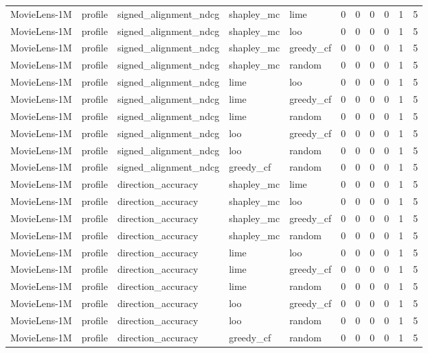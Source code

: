\begin{table}[t]
{\begin{tabular}{lllllrrrrrr}
MovieLens-1M & profile & signed\_alignment\_ndcg & shapley\_mc & lime & 0 & 0 & 0 & 0 & 1 & 5 \\
MovieLens-1M & profile & signed\_alignment\_ndcg & shapley\_mc & loo & 0 & 0 & 0 & 0 & 1 & 5 \\
MovieLens-1M & profile & signed\_alignment\_ndcg & shapley\_mc & greedy\_cf & 0 & 0 & 0 & 0 & 1 & 5 \\
MovieLens-1M & profile & signed\_alignment\_ndcg & shapley\_mc & random & 0 & 0 & 0 & 0 & 1 & 5 \\
MovieLens-1M & profile & signed\_alignment\_ndcg & lime & loo & 0 & 0 & 0 & 0 & 1 & 5 \\
MovieLens-1M & profile & signed\_alignment\_ndcg & lime & greedy\_cf & 0 & 0 & 0 & 0 & 1 & 5 \\
MovieLens-1M & profile & signed\_alignment\_ndcg & lime & random & 0 & 0 & 0 & 0 & 1 & 5 \\
MovieLens-1M & profile & signed\_alignment\_ndcg & loo & greedy\_cf & 0 & 0 & 0 & 0 & 1 & 5 \\
MovieLens-1M & profile & signed\_alignment\_ndcg & loo & random & 0 & 0 & 0 & 0 & 1 & 5 \\
MovieLens-1M & profile & signed\_alignment\_ndcg & greedy\_cf & random & 0 & 0 & 0 & 0 & 1 & 5 \\
MovieLens-1M & profile & direction\_accuracy & shapley\_mc & lime & 0 & 0 & 0 & 0 & 1 & 5 \\
MovieLens-1M & profile & direction\_accuracy & shapley\_mc & loo & 0 & 0 & 0 & 0 & 1 & 5 \\
MovieLens-1M & profile & direction\_accuracy & shapley\_mc & greedy\_cf & 0 & 0 & 0 & 0 & 1 & 5 \\
MovieLens-1M & profile & direction\_accuracy & shapley\_mc & random & 0 & 0 & 0 & 0 & 1 & 5 \\
MovieLens-1M & profile & direction\_accuracy & lime & loo & 0 & 0 & 0 & 0 & 1 & 5 \\
MovieLens-1M & profile & direction\_accuracy & lime & greedy\_cf & 0 & 0 & 0 & 0 & 1 & 5 \\
MovieLens-1M & profile & direction\_accuracy & lime & random & 0 & 0 & 0 & 0 & 1 & 5 \\
MovieLens-1M & profile & direction\_accuracy & loo & greedy\_cf & 0 & 0 & 0 & 0 & 1 & 5 \\
MovieLens-1M & profile & direction\_accuracy & loo & random & 0 & 0 & 0 & 0 & 1 & 5 \\
MovieLens-1M & profile & direction\_accuracy & greedy\_cf & random & 0 & 0 & 0 & 0 & 1 & 5 \\

\end{tabular}}
\end{table}
